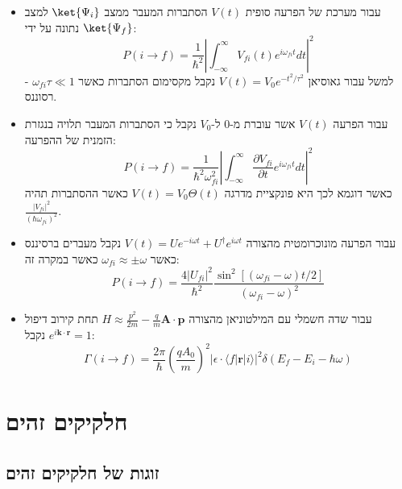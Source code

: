 \documentclass{tstextbook}
\begin{document}
\begin{summary}
  \begin{itemize}
    \item עבור מערכת של הפרעה סופית \(V(t)\) הסתברות המעבר ממצב \(\ket{\Psi_{i}}\) למצב \(\ket{\Psi_{f}}\) נתונה על ידי:
$$P(i\to f)={\frac{1}{\hbar^{2}}}\left|\int_{-\infty}^{\infty}V_{f i}(t)e^{i\omega_{f i}t}d t\right|^{2}$$
למשל עבור גאוסיאן \(V(t)=V_{0}e^{ -t^{2}/\tau^{2} }\) נקבל מקסימום הסתברות כאשר \(\omega_{fi}\tau\ll 1\) - רסוננס.
    \item עבור הפרעה \(V(t)\) אשר עוברת מ-0 ל-\(V_{0}\) נקבל כי הסתברות המעבר תלויה בנגזרת הזמנית של ההפרעה:
$$P(i\to f)=\frac{1}{\hbar^{2}\omega_{f i}^{2}}\left|\int_{-\infty}^{\infty}\frac{\partial V_{f i}}{\partial t}e^{i\omega_{f i}t}d t\right|^{2}$$
כאשר דוגמא לכך היא פונקציית מדרגה \(V(t)=V_{0}\Theta(t)\) כאשר ההסתברות תהיה \(\frac{|V_{fi}|^{2}}{(\hbar \omega_{fi})^{2}}\).
    \item עבור הפרעה מונוכרומטית מהצורה \(V(t)=U e^{-i\omega t}+U^{\dagger}e^{i\omega t}\) נקבל מעברים ברסיננס כאשר \(\omega_{fi}\approx\pm \omega\) כאשר במקרה זה:
$$P(i\to f)=\frac{4|U_{f i}|^{2}}{\hbar^{2}}\frac{\sin^{2}[(\omega_{f i}-\omega)t/2]}{(\omega_{f i}-\omega)^{2}}$$
    \item עבור שדה חשמלי עם המילטוניאן מהצורה \(H\approx \frac{p^{2}}{2m}-\frac{q}{m}\mathbf{A\cdot p}\) תחת קירוב דיפול \(e^{ i\mathbf{k\cdot r} }=1\) נקבל:
$$\Gamma(i\to f)=\frac{2\pi}{\hbar}\left(\frac{q A_{0}}{m}\right)^{2}|\epsilon\cdot\langle f|\mathbf{r}|i\rangle|^{2}\delta(E_{f}-E_{i}-\hbar\omega)$$
  \end{itemize}
\end{summary}
\chapter{חלקיקים זהים}

\section{זוגות של חלקיקים זהים}
\end{document}
